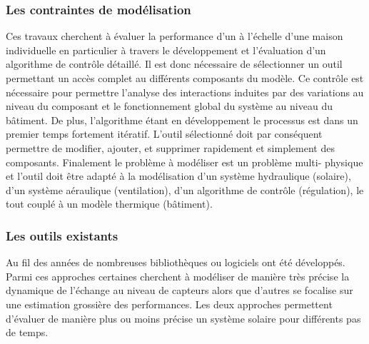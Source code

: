 \subsubsection{Les contraintes de modélisation} %
\label{ssub:les_contraintes_de_modelisation}
Ces travaux cherchent à évaluer la performance d’un  à l’échelle d’une maison
individuelle en particulier à travers le développement et l’évaluation d’un algorithme de
contrôle détaillé. Il est donc nécessaire de sélectionner un outil permettant un accès
complet au différents composants du modèle. Ce contrôle est nécessaire pour permettre
l’analyse des interactions induites par des variations au niveau du composant et le
fonctionnement global du système au niveau du bâtiment. De plus, l’algorithme étant en
développement le processus est dans un premier temps fortement itératif. L’outil
sélectionné doit par conséquent permettre de modifier, ajouter, et supprimer rapidement et
simplement des composants. Finalement le problème à modéliser est un problème multi-
physique et l’outil doit être adapté à la modélisation d’un système hydraulique (solaire),
d’un système aéraulique (ventilation), d’un algorithme de contrôle (régulation), le tout
couplé à un modèle thermique (bâtiment).


\subsubsection{Les outils existants} %
\label{ssub:les_outils_existants}
Au fil des années de nombreuses bibliothèques ou logiciels ont été développés. Parmi ces
approches certaines cherchent à modéliser de manière très précise la dynamique de
l’échange au niveau de capteurs alors que d’autres se focalise sur une estimation
grossière des performances. Les deux approches permettent d’évaluer de manière plus ou
moins précise un système solaire pour différents pas de temps.

